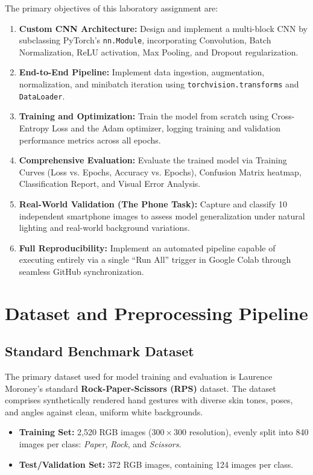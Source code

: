 \documentclass[11pt,a4paper]{article}
\begin{document}
The primary objectives of this laboratory assignment are:
\begin{enumerate}[leftmargin=1.5em, itemsep=2pt]
    \item \textbf{Custom CNN Architecture:} Design and implement a multi-block CNN by subclassing PyTorch's \texttt{nn.Module}, incorporating Convolution, Batch Normalization, ReLU activation, Max Pooling, and Dropout regularization.
    \item \textbf{End-to-End Pipeline:} Implement data ingestion, augmentation, normalization, and minibatch iteration using \texttt{torchvision.transforms} and \texttt{DataLoader}.
    \item \textbf{Training and Optimization:} Train the model from scratch using Cross-Entropy Loss and the Adam optimizer, logging training and validation performance metrics across all epochs.
    \item \textbf{Comprehensive Evaluation:} Evaluate the trained model via Training Curves (Loss vs. Epochs, Accuracy vs. Epochs), Confusion Matrix heatmap, Classification Report, and Visual Error Analysis.
    \item \textbf{Real-World Validation (The Phone Task):} Capture and classify 10 independent smartphone images to assess model generalization under natural lighting and real-world background variations.
    \item \textbf{Full Reproducibility:} Implement an automated pipeline capable of executing entirely via a single ``Run All'' trigger in Google Colab through seamless GitHub synchronization.
\end{enumerate}

\section{Dataset and Preprocessing Pipeline}

\subsection{Standard Benchmark Dataset}
The primary dataset used for model training and evaluation is Laurence Moroney's standard \textbf{Rock-Paper-Scissors (RPS)} dataset. The dataset comprises synthetically rendered hand gestures with diverse skin tones, poses, and angles against clean, uniform white backgrounds.
\begin{itemize}[leftmargin=1.5em, itemsep=2pt]
    \item \textbf{Training Set:} 2,520 RGB images ($300 \times 300$ resolution), evenly split into 840 images per class: \textit{Paper}, \textit{Rock}, and \textit{Scissors}.
    \item \textbf{Test/Validation Set:} 372 RGB images, containing 124 images per class.
\end{itemize}
\end{document}
